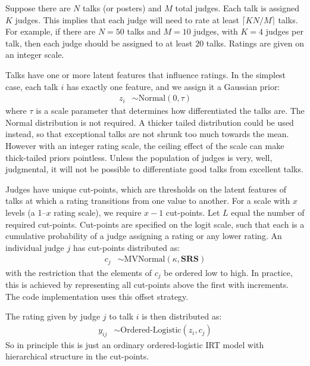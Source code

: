 \documentclass[reqno ,11pt]{amsart}
\begin{document}
Suppose there are $N$ talks (or posters) and $M$ total judges. Each talk is assigned $K$ judges. This implies that each judge will need to rate at least $\lceil KN/M \rceil$ talks. For example, if there are $N=50$ talks and $M=10$ judges, with $K=4$ judges per talk, then each judge should be assigned to at least $20$ talks. Ratings are given on an integer scale. 

Talks have one or more latent features that influence ratings. In the simplest case, each talk $i$ has exactly one feature, and we assign it a Gaussian prior:
\begin{align*}
  z_i &\sim \text{Normal}(0,\tau)
\end{align*}
where $\tau$ is a scale parameter that determines how differentiated the talks are. The Normal distribution is not required. A thicker tailed distribution could be used instead, so that exceptional talks are not shrunk too much towards the mean. However with an integer rating scale, the ceiling effect of the scale can make thick-tailed priors pointless. Unless the population of judges is very, well, judgmental, it will not be possible to differentiate good talks from excellent talks.



Judges have unique cut-points, which are thresholds on the latent features of talks at which a rating transitions from one value to another. For a scale with $x$ levels (a 1--$x$ rating scale), we require $x-1$ cut-points. Let $L$ equal the number of required cut-points. Cut-points are specified on the logit scale, such that each is a cumulative probability of a judge assigning a rating or any lower rating. An individual judge $j$ has cut-points distributed as:
\begin{align*}
  c_j &\sim \text{MVNormal}(\kappa,\mathbf{SRS})
\end{align*}
with the restriction that the elements of $c_j$ be ordered low to high. In practice, this is achieved by representing all cut-points above the first with increments. The code implementation uses this offset strategy.


The rating given by judge $j$ to talk $i$ is then distributed as:
\begin{align*}
  y_{ij} &\sim \text{Ordered-Logistic}(z_i,c_j)
\end{align*}
So in principle this is just an ordinary ordered-logistic IRT model with hierarchical structure in the cut-points. 
\end{document}
